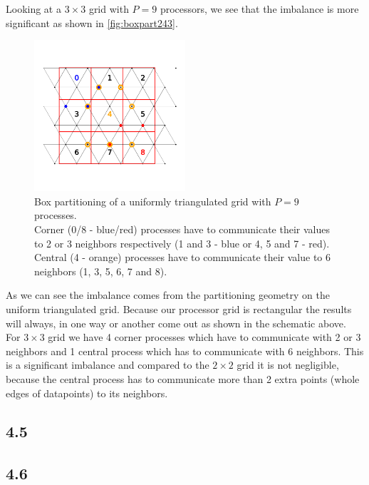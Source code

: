 Looking at a $3\times3$ grid with $P=9$ processors, we see that the imbalance is more significant as shown in \autoref{fig:boxpart243}.\\
\begin{figure}[H]
    \centering
    \includegraphics[width=0.5\textwidth]{../fig/lab2/grid_3x3_partition.png}
    \caption{Box partitioning of a uniformly triangulated grid with $P=9$ processes.\\
    Corner (0/8 - blue/red) processes have to communicate their values to 2 or 3 neighbors respectively (1 and 3 - blue or 4, 5 and 7 - red).\\
    Central (4 - orange) processes have to communicate their value to 6 neighbors (1, 3, 5, 6, 7 and 8).}
    \label{fig:boxpart243}
\end{figure}
As we can see the imbalance comes from the partitioning geometry on the uniform triangulated grid. Because our processor grid is rectangular the results will always, in one way or another come out as shown in the schematic above.\\
For $3\times3$ grid we have 4 corner processes which have to communicate with 2 or 3 neighbors and 1 central process which has to communicate with 6 neighbors. This is a significant imbalance and compared to the $2\times2$ grid it is not negligible, because the central process has to communicate more than 2 extra points (whole edges of datapoints) to its neighbors.\\
\subsection{4.5}
\subsection{4.6}
